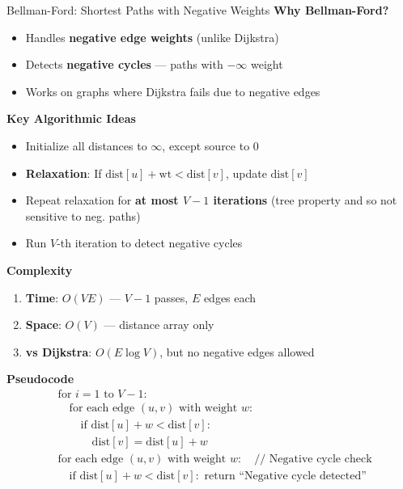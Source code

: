 \documentclass{beamer}
\begin{document}
\begin{frame}{Bellman-Ford: Shortest Paths with Negative Weights}
\tiny
\textcolor{new_turquoise}{\bf Why Bellman-Ford?}

\begin{itemize}
\item Handles \textbf{negative edge weights} (unlike Dijkstra)
    \item Detects \textbf{negative cycles} — paths with $-\infty$ weight
    \item Works on graphs where Dijkstra fails due to negative edges
\end{itemize}

\vspace{0.3cm}
\textcolor{new_turquoise}{\bf Key Algorithmic Ideas}
\begin{itemize}
\item Initialize all distances to $\infty$, except source to $0$
    \item \textbf{Relaxation}: If $\text{dist}[u] + \text{wt} < \text{dist}[v]$, update $\text{dist}[v]$
    \item Repeat relaxation for \textbf{at most $V-1$ iterations} (tree property and so not sensitive to neg. paths)
    \item Run $V$-th iteration to detect negative cycles
\end{itemize}
\vspace{0.3cm}
\textcolor{new_turquoise}{\bf Complexity}
\begin{enumerate}
\item \textbf{Time}: $O(VE)$ — $V-1$ passes, $E$ edges each
    \item \textbf{Space}: $O(V)$ — distance array only
    \item \textbf{vs Dijkstra}: $O(E \log V)$, but no negative edges allowed
\end{enumerate}
\vspace{0.2cm}
\textcolor{new_turquoise}{\bf Pseudocode}
\begin{align*}
&\text{for } i = 1 \text{ to } V-1: \\
&\quad \text{for each edge } (u,v) \text{ with weight } w: \\
&\quad\quad \text{if } \text{dist}[u] + w < \text{dist}[v]: \\
&\quad\quad\quad \text{dist}[v] = \text{dist}[u] + w \\
&\text{for each edge } (u,v) \text{ with weight } w: \quad \text{// Negative cycle check} \\
&\quad \text{if } \text{dist}[u] + w < \text{dist}[v]: \text{ return ``Negative cycle detected''}
\end{align*}
\end{frame}
\end{document}
